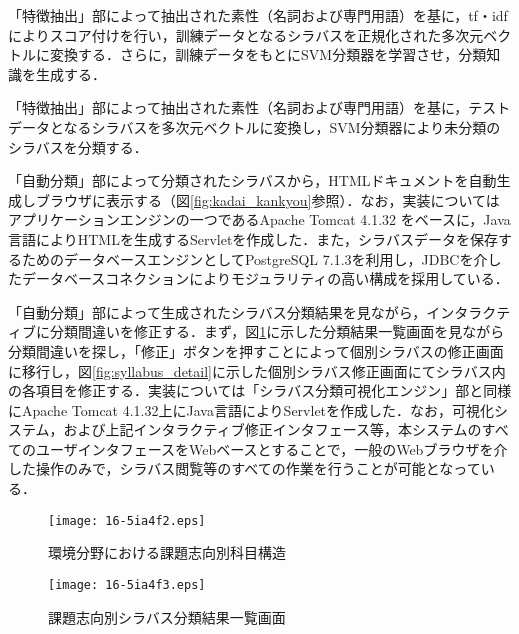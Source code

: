 \documentclass[japanese]{jnlp_1.4}
\begin{document}
\noindent
{}

「特徴抽出」部によって抽出された素性（名詞および専門用語）を基に，tf・idf  によりスコア付けを行い，訓練データとなるシラバスを正規化された多次元ベクトルに変換する．さらに，訓練データをもとにSVM分類器を学習させ，分類知識を生成する．

\noindent
{}

「特徴抽出」部によって抽出された素性（名詞および専門用語）を基に，テストデータとなるシラバスを多次元ベクトルに変換し，SVM分類器により未分類のシラバスを分類する．

\noindent
{}

「自動分類」部によって分類されたシラバスから，HTMLドキュメントを自動生成しブラウザに表示する（図\ref{fig:kadai_kankyou}参照）．なお，実装についてはアプリケーションエンジンの一つであるApache Tomcat 4.1.32 をベースに，Java 言語によりHTMLを生成するServletを作成した．また，シラバスデータを保存するためのデータベースエンジンとしてPostgreSQL 7.1.3を利用し，JDBCを介したデータベースコネクションによりモジュラリティの高い構成を採用している．

\noindent
{}

「自動分類」部によって生成されたシラバス分類結果を見ながら，インタラクティブに分類間違いを修正する．まず，図\ref{fig:syllabus_list}に示した分類結果一覧画面を見ながら分類間違いを探し，「修正」ボタンを押すことによって個別シラバスの修正画面に移行し，図\ref{fig:syllabus_detail}に示した個別シラバス修正画面にてシラバス内の各項目を修正する．実装については「シラバス分類可視化エンジン」部と同様にApache Tomcat 4.1.32上にJava言語によりServletを作成した．なお，可視化システム，および上記インタラクティブ修正インタフェース等，本システムのすべてのユーザインタフェースをWebベースとすることで，一般のWebブラウザを介した操作のみで，シラバス閲覧等のすべての作業を行うことが可能となっている．

\begin{figure}[b]
\begin{minipage}[b]{0.45\textwidth}
\begin{center}
\texttt{[image: 16-5ia4f2.eps]}
\end{center}
\caption{環境分野における課題志向別科目構造}
\label{fig:kadai_kankyou}
\end{minipage}
\hfill
\begin{minipage}[b]{0.45\textwidth}
\begin{center}
\texttt{[image: 16-5ia4f3.eps]}
\end{center}
\caption{課題志向別シラバス分類結果一覧画面}
\label{fig:syllabus_list}
\end{minipage}
\end{figure}
\end{document}
